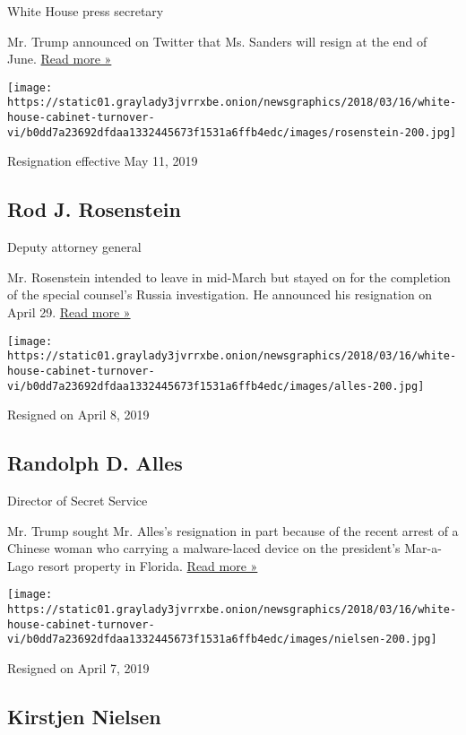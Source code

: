 White House press secretary

Mr. Trump announced on Twitter that Ms. Sanders will resign at the end
of June.
\href{https://www.nytimes3xbfgragh.onion/2019/06/13/us/politics/sarah-huckabee-sanders.html}{Read
more »}

\texttt{[image: https://static01.graylady3jvrrxbe.onion/newsgraphics/2018/03/16/white-house-cabinet-turnover-vi/b0dd7a23692dfdaa1332445673f1531a6ffb4edc/images/rosenstein-200.jpg]}

Resignation effective May 11, 2019

\hypertarget{rod-j-rosenstein}{%
\subsection{Rod J. Rosenstein}\label{rod-j-rosenstein}}

Deputy attorney general

Mr. Rosenstein intended to leave in mid-March but stayed on for the
completion of the special counsel's Russia investigation. He announced
his resignation on April 29.
\href{https://www.nytimes3xbfgragh.onion/2019/04/29/us/politics/rod-rosenstein-resigns.html}{Read
more »}

\texttt{[image: https://static01.graylady3jvrrxbe.onion/newsgraphics/2018/03/16/white-house-cabinet-turnover-vi/b0dd7a23692dfdaa1332445673f1531a6ffb4edc/images/alles-200.jpg]}

Resigned on April 8, 2019

\hypertarget{randolph-d-alles}{%
\subsection{Randolph D. Alles}\label{randolph-d-alles}}

Director of Secret Service

Mr. Trump sought Mr. Alles's resignation in part because of the recent
arrest of a Chinese woman who carrying a malware-laced device on the
president's Mar-a-Lago resort property in Florida.
\href{https://www.nytimes3xbfgragh.onion/2019/04/08/us/politics/homeland-security-trump-purge.html}{Read
more »}

\texttt{[image: https://static01.graylady3jvrrxbe.onion/newsgraphics/2018/03/16/white-house-cabinet-turnover-vi/b0dd7a23692dfdaa1332445673f1531a6ffb4edc/images/nielsen-200.jpg]}

Resigned on April 7, 2019

\hypertarget{kirstjen-nielsen}{%
\subsection{Kirstjen Nielsen}\label{kirstjen-nielsen}}

